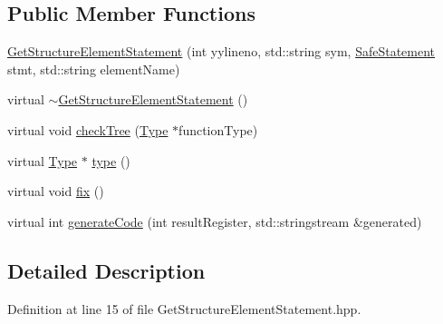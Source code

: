 \subsection*{Public Member Functions}
\begin{DoxyCompactItemize}
\item 
\hyperlink{class_scribble_core_1_1_get_structure_element_statement_ace2700ed36be23d2c5c7a6a1db118caa}{Get\-Structure\-Element\-Statement} (int yylineno, std\-::string sym, \hyperlink{namespace_scribble_core_a2ad5bf236bc9164cb56f564685f15a11}{Safe\-Statement} stmt, std\-::string element\-Name)
\item 
virtual \hyperlink{class_scribble_core_1_1_get_structure_element_statement_a79b621737d1cf80ee6fb5c6cb6727b2f}{$\sim$\-Get\-Structure\-Element\-Statement} ()
\item 
virtual void \hyperlink{class_scribble_core_1_1_get_structure_element_statement_a50b0c529a7b20c3b593bf25eca31cbed}{check\-Tree} (\hyperlink{class_scribble_core_1_1_type}{Type} $\ast$function\-Type)
\item 
virtual \hyperlink{class_scribble_core_1_1_type}{Type} $\ast$ \hyperlink{class_scribble_core_1_1_get_structure_element_statement_a067650790a16cda525f833e0026628d1}{type} ()
\item 
virtual void \hyperlink{class_scribble_core_1_1_get_structure_element_statement_a956597b81888a8a23e7fe0b7fb6efe0b}{fix} ()
\item 
virtual int \hyperlink{class_scribble_core_1_1_get_structure_element_statement_abf03d398899bb7d6c33192eb3597d45d}{generate\-Code} (int result\-Register, std\-::stringstream \&generated)
\end{DoxyCompactItemize}


\subsection{Detailed Description}


Definition at line 15 of file Get\-Structure\-Element\-Statement.\-hpp.



